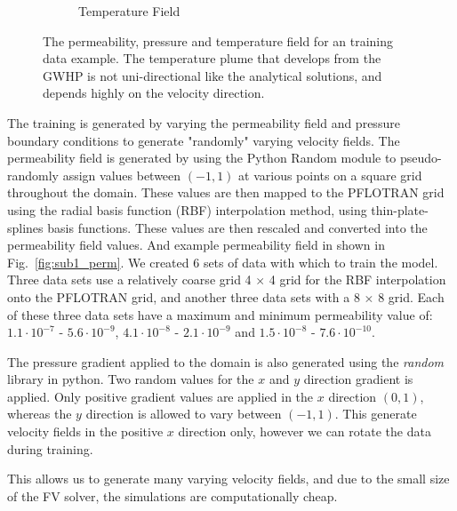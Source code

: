 \documentclass{article} %
\begin{document}
\begin{figure}
\begin{subfigure}{.33\textwidth}
  \caption{Temperature Field}
  \label{fig:sub1_temp}
\end{subfigure}%
\caption{The permeability, pressure and temperature field for an training data example. The temperature plume that develops from the GWHP is not uni-directional like the analytical solutions, and depends highly on the velocity direction.}
\label{fig:test}
\end{figure}




The training is generated by varying the permeability field and pressure boundary conditions to generate "randomly" varying velocity fields. The permeability field is generated by using the Python Random module to pseudo-randomly assign values between $(-1 , 1)$ at various points on a square grid throughout the domain. These values are then mapped to the PFLOTRAN grid using the radial basis function (RBF) interpolation method, using thin-plate-splines basis functions. These values are then rescaled and converted into the permeability field values. And example permeability field in shown in Fig.~\ref{fig:sub1_perm}. We created 6 sets of data with which to train the model. Three data sets use a relatively coarse grid 4 $\times$ 4 grid for the RBF interpolation onto the PFLOTRAN grid, and another three data sets with a 8 $\times$ 8 grid. Each of these three data sets have a maximum and minimum permeability value of: $1.1 \cdot 10^{-7}$ - $5.6 \cdot 10^{-9}$, $4.1 \cdot 10^{-8}$ - $2.1 \cdot 10^{-9}$ and $1.5 \cdot 10^{-8}$ - $7.6 \cdot 10^{-10}$.

The pressure gradient applied to the domain is also generated using the \textit{random} library in python. Two random values for the $x$ and $y$ direction gradient is applied. Only positive gradient values are applied in the $x$ direction $(0 , 1)$, whereas the $y$ direction is allowed to vary between $(-1 , 1)$. This generate velocity fields in the positive $x$ direction only, however we can rotate the data during training. 

This allows us to generate many varying velocity fields, and due to the small size of the FV solver, the simulations are computationally cheap.



\end{document}
